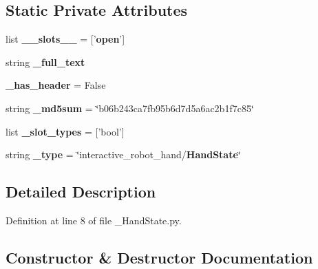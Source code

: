 \subsection*{Static Private Attributes}
\begin{DoxyCompactItemize}
\item 
list {\bf \-\_\-\-\_\-slots\-\_\-\-\_\-} = ['{\bf open}']
\item 
string {\bf \-\_\-full\-\_\-text}
\item 
{\bf \-\_\-has\-\_\-header} = False
\item 
string {\bf \-\_\-md5sum} = \char`\"{}b06b243ca7fb95b6d7d5a6ac2b1f7c85\char`\"{}
\item 
list {\bf \-\_\-slot\-\_\-types} = ['bool']
\item 
string {\bf \-\_\-type} = \char`\"{}interactive\-\_\-robot\-\_\-hand/{\bf Hand\-State}\char`\"{}
\end{DoxyCompactItemize}


\subsection{Detailed Description}


Definition at line 8 of file \-\_\-\-Hand\-State.\-py.



\subsection{Constructor \& Destructor Documentation}
